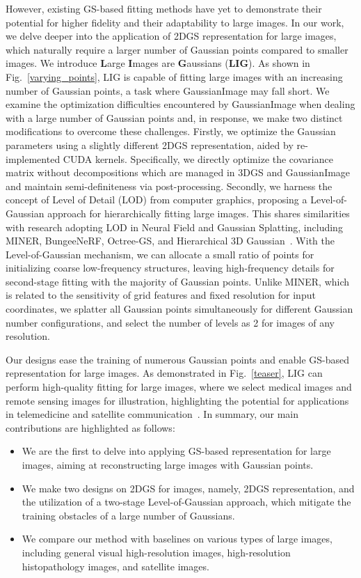 However, existing GS-based fitting methods have yet to demonstrate their potential for higher fidelity and their adaptability to large images. In our work, we delve deeper into the application of 2DGS representation for large images, which naturally require a larger number of Gaussian points compared to smaller images. We introduce \textbf{L}arge \textbf{I}mages are \textbf{G}aussians (\textbf{LIG}). As shown in Fig.~\ref{varying_points}, LIG is capable of fitting large images with an increasing number of Gaussian points, a task where GaussianImage may fall short. We examine the optimization difficulties encountered by GaussianImage when dealing with a large number of Gaussian points and, in response, we make two distinct modifications to overcome these challenges. Firstly, we optimize the Gaussian parameters using a slightly different 2DGS representation, aided by re-implemented CUDA kernels.
Specifically, we directly optimize the covariance matrix without decompositions which are managed in 3DGS and GaussianImage~\cite{kerbl20233d,zhang2024gaussianimage} and maintain semi-definiteness via post-processing. Secondly, we harness the concept of Level of Detail (LOD) from computer graphics, proposing a Level-of-Gaussian approach for hierarchically fitting large images. This shares similarities with research adopting LOD in Neural Field and Gaussian Splatting, including MINER, BungeeNeRF, Octree-GS, and Hierarchical 3D Gaussian~\cite{saragadam2022miner, ren2024octree, xiangli2022bungeenerf, kerbl2024hierarchical}. With the Level-of-Gaussian mechanism, we can allocate a small ratio of points for initializing coarse low-frequency structures, leaving high-frequency details for second-stage fitting with the majority of Gaussian points. Unlike MINER, which is related to the sensitivity of grid features and fixed resolution for input coordinates, we splatter all Gaussian points simultaneously for different Gaussian number configurations, and select the number of levels as 2 for images of any resolution. 

Our designs ease the training of numerous Gaussian points and enable GS-based representation for large images. As demonstrated in Fig.~\ref{teaser}, LIG can perform high-quality fitting for large images, where we select medical images and remote sensing images for illustration, highlighting the potential for applications in telemedicine and satellite communication~\cite{mittermaier2023digital, de2015satellite}. In summary, our main contributions are highlighted as follows:
\begin{itemize}
    \item We are the first to delve into applying GS-based representation for large images, aiming at reconstructing large images with Gaussian points.
    \item We make two designs on 2DGS for images, namely, 2DGS representation, and the utilization of a two-stage Level-of-Gaussian approach, which mitigate the training obstacles of a large number of Gaussians.
    \item We compare our method with baselines on various types of large images, including general visual high-resolution images, high-resolution histopathology images, and satellite images.
\end{itemize}
